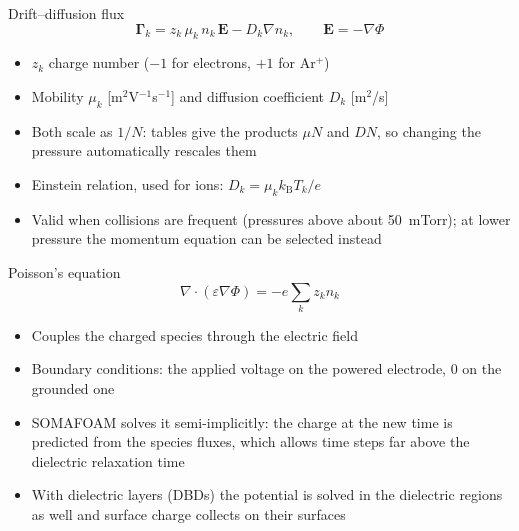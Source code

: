 \documentclass[aspectratio=169,11pt]{beamer}
\begin{document}
\begin{frame}{Drift--diffusion flux}
  \begin{equation*}
    \boldsymbol{\Gamma}_k = z_k\,\mu_k\,n_k\,\mathbf{E} - D_k\nabla n_k ,
    \qquad \mathbf{E}=-\nabla\Phi
  \end{equation*}
  \begin{itemize}
    \item $z_k$ charge number ($-1$ for electrons, $+1$ for Ar$^+$)
    \item Mobility $\mu_k$ [m$^2$V$^{-1}$s$^{-1}$] and diffusion coefficient $D_k$ [m$^2$/s]
    \item Both scale as $1/N$: tables give the products $\mu N$ and $DN$, so changing
          the pressure automatically rescales them
    \item Einstein relation, used for ions: $D_k=\mu_k k_\mathrm{B}T_k/e$
    \item Valid when collisions are frequent (pressures above about 50~mTorr); at lower
          pressure the momentum equation can be selected instead
  \end{itemize}
\end{frame}

\begin{frame}{Poisson's equation}
  \begin{equation*}
    \nabla\cdot(\varepsilon\nabla\Phi) = -e\sum_k z_k n_k
  \end{equation*}
  \begin{itemize}
    \item Couples the charged species through the electric field
    \item Boundary conditions: the applied voltage on the powered electrode,
          0 on the grounded one
    \item SOMAFOAM solves it semi-implicitly: the charge at the new time is predicted
          from the species fluxes, which allows time steps far above the
          dielectric relaxation time
    \item With dielectric layers (DBDs) the potential is solved in the dielectric regions
          as well and surface charge collects on their surfaces
  \end{itemize}
\end{frame}
\end{document}
